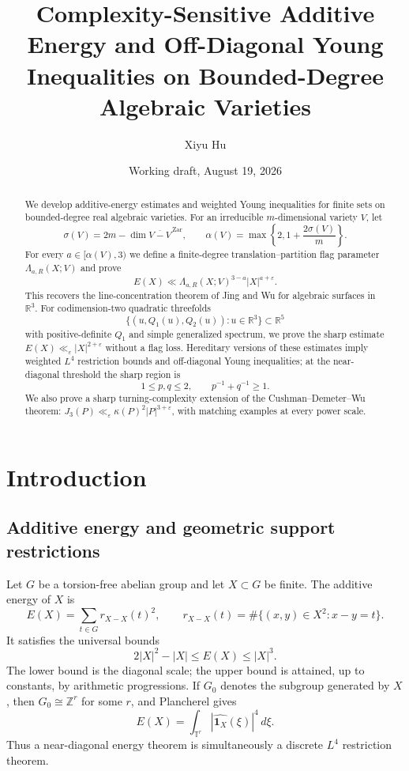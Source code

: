 \documentclass[11pt]{amsart}
\title[Additive energy on algebraic varieties]{Complexity-Sensitive Additive Energy and Off-Diagonal Young Inequalities on Bounded-Degree Algebraic Varieties}
\author{Xiyu Hu}
\date{Working draft, August 19, 2026}
\numberwithin{equation}{section}
\theoremstyle{definition}
\theoremstyle{remark}
\newcommand{\Z}{\mathbb Z}
\newcommand{\T}{\mathbb T}
\newcommand{\1}{\mathbf 1}
\newcommand{\card}[1]{\lvert #1\rvert}
\begin{document}
\begin{abstract}
We develop additive-energy estimates and weighted Young inequalities for finite sets on bounded-degree real algebraic varieties.  For an irreducible $m$-dimensional variety $V$, let
\[
 \sigma(V)=2m-\dim\overline{V-V}^{\,\mathrm{Zar}},
 \qquad
 \alpha(V)=\max\left\{2,1+\frac{2\sigma(V)}m\right\}.
\]
For every $a\in[\alpha(V),3)$ we define a finite-degree translation--partition flag parameter $\Lambda_{a,R}(X;V)$ and prove
\[
 E(X)\ll \Lambda_{a,R}(X;V)^{3-a}|X|^{a+\varepsilon}.
\]
This recovers the line-concentration theorem of Jing and Wu for algebraic surfaces in $\mathbb R^3$.  For codimension-two quadratic threefolds
\[
 \{(u,Q_1(u),Q_2(u)):u\in\mathbb R^3\}\subset\mathbb R^5
\]
with positive-definite $Q_1$ and simple generalized spectrum, we prove the sharp estimate $E(X)\ll_\varepsilon |X|^{2+\varepsilon}$ without a flag loss.  Hereditary versions of these estimates imply weighted $L^4$ restriction bounds and off-diagonal Young inequalities; at the near-diagonal threshold the sharp region is
\[
 1\le p,q\le2,\qquad p^{-1}+q^{-1}\ge1.
\]
We also prove a sharp turning-complexity extension of the Cushman--Demeter--Wu theorem: $J_3(P)\ll_\varepsilon \kappa(P)^2|P|^{3+\varepsilon}$, with matching examples at every power scale.
\end{abstract}

\maketitle

\section{Introduction}

\subsection{Additive energy and geometric support restrictions}
Let $G$ be a torsion-free abelian group and let $X\subset G$ be finite.  The additive energy of $X$ is
\begin{equation}\label{eq:intro-energy}
 E(X)=\sum_{t\in G}r_{X-X}(t)^2,
 \qquad
 r_{X-X}(t)=\#\{(x,y)\in X^2:x-y=t\}.
\end{equation}
It satisfies the universal bounds
\[
 2\card X^2-\card X\leq E(X)\leq \card X^3.
\]
The lower bound is the diagonal scale; the upper bound is attained, up to constants, by arithmetic progressions.  If $G_0$ denotes the subgroup generated by $X$, then $G_0\cong\Z^r$ for some $r$, and Plancherel gives
\begin{equation}\label{eq:intro-fourier}
 E(X)=\int_{\T^r}\left|\widehat{\1_X}(\xi)\right|^4\,d\xi.
\end{equation}
Thus a near-diagonal energy theorem is simultaneously a discrete $L^4$ restriction theorem.
\end{document}
